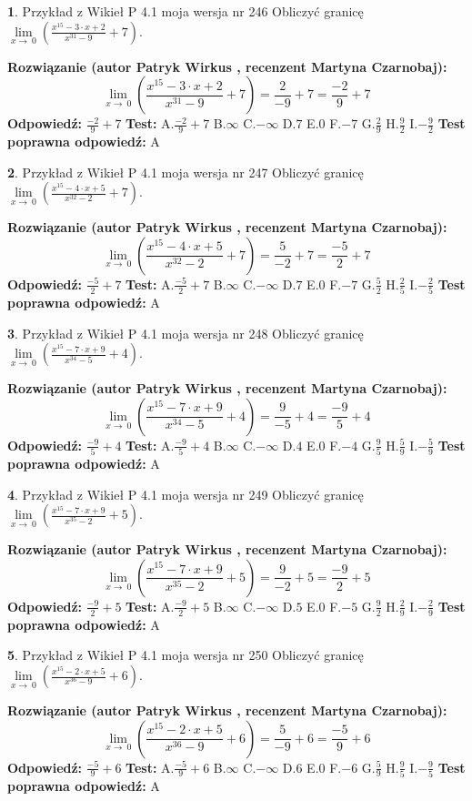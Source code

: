 \documentclass[12pt, a4paper]{article}
\theoremstyle{definition} %
\newtheorem{zad}{}
\newcommand{\zadStart}[1]{\begin{zad}#1\newline}
\newcommand{\zadStop}{\end{zad}}
\newcommand{\rozwStart}[2]{\noindent \textbf{Rozwiązanie (autor #1 , recenzent #2): }\newline}
\newcommand{\rozwStop}{\newline}
\newcommand{\odpStart}{\noindent \textbf{Odpowiedź:}\newline}
\newcommand{\odpStop}{\newline}
\newcommand{\testStart}{\noindent \textbf{Test:}\newline}
\newcommand{\testStop}{\newline}
\newcommand{\kluczStart}{\noindent \textbf{Test poprawna odpowiedź:}\newline}
\newcommand{\kluczStop}{\newline}
\begin{document}
\zadStart{Przykład z Wikieł P 4.1 moja wersja nr 246}
Obliczyć granicę $\lim\limits_{x\to\ 0}(\frac{x^{15}-3 \cdot x +2}{x^{31}-9}+7)$.
\zadStop
\rozwStart{Patryk Wirkus}{Martyna Czarnobaj}
$$\lim\limits_{x\to\ 0}(\frac{x^{15}-3 \cdot x +2}{x^{31}-9}+7)=\frac{2}{-9}+7=\frac{-2}{9}+7$$
\rozwStop
\odpStart
$\frac{-2}{9}+7$
\odpStop
\testStart
A.$\frac{-2}{9}+7$
B.$\infty$
C.$-\infty$
D.$7$
E.$0$
F.$-7$
G.$\frac{2}{9}$
H.$\frac{9}{2}$
I.$-\frac{9}{2}$
\testStop
\kluczStart
A
\kluczStop



\zadStart{Przykład z Wikieł P 4.1 moja wersja nr 247}
Obliczyć granicę $\lim\limits_{x\to\ 0}(\frac{x^{15}-4 \cdot x +5}{x^{32}-2}+7)$.
\zadStop
\rozwStart{Patryk Wirkus}{Martyna Czarnobaj}
$$\lim\limits_{x\to\ 0}(\frac{x^{15}-4 \cdot x +5}{x^{32}-2}+7)=\frac{5}{-2}+7=\frac{-5}{2}+7$$
\rozwStop
\odpStart
$\frac{-5}{2}+7$
\odpStop
\testStart
A.$\frac{-5}{2}+7$
B.$\infty$
C.$-\infty$
D.$7$
E.$0$
F.$-7$
G.$\frac{5}{2}$
H.$\frac{2}{5}$
I.$-\frac{2}{5}$
\testStop
\kluczStart
A
\kluczStop



\zadStart{Przykład z Wikieł P 4.1 moja wersja nr 248}
Obliczyć granicę $\lim\limits_{x\to\ 0}(\frac{x^{15}-7 \cdot x +9}{x^{34}-5}+4)$.
\zadStop
\rozwStart{Patryk Wirkus}{Martyna Czarnobaj}
$$\lim\limits_{x\to\ 0}(\frac{x^{15}-7 \cdot x +9}{x^{34}-5}+4)=\frac{9}{-5}+4=\frac{-9}{5}+4$$
\rozwStop
\odpStart
$\frac{-9}{5}+4$
\odpStop
\testStart
A.$\frac{-9}{5}+4$
B.$\infty$
C.$-\infty$
D.$4$
E.$0$
F.$-4$
G.$\frac{9}{5}$
H.$\frac{5}{9}$
I.$-\frac{5}{9}$
\testStop
\kluczStart
A
\kluczStop



\zadStart{Przykład z Wikieł P 4.1 moja wersja nr 249}
Obliczyć granicę $\lim\limits_{x\to\ 0}(\frac{x^{15}-7 \cdot x +9}{x^{35}-2}+5)$.
\zadStop
\rozwStart{Patryk Wirkus}{Martyna Czarnobaj}
$$\lim\limits_{x\to\ 0}(\frac{x^{15}-7 \cdot x +9}{x^{35}-2}+5)=\frac{9}{-2}+5=\frac{-9}{2}+5$$
\rozwStop
\odpStart
$\frac{-9}{2}+5$
\odpStop
\testStart
A.$\frac{-9}{2}+5$
B.$\infty$
C.$-\infty$
D.$5$
E.$0$
F.$-5$
G.$\frac{9}{2}$
H.$\frac{2}{9}$
I.$-\frac{2}{9}$
\testStop
\kluczStart
A
\kluczStop



\zadStart{Przykład z Wikieł P 4.1 moja wersja nr 250}
Obliczyć granicę $\lim\limits_{x\to\ 0}(\frac{x^{15}-2 \cdot x +5}{x^{36}-9}+6)$.
\zadStop
\rozwStart{Patryk Wirkus}{Martyna Czarnobaj}
$$\lim\limits_{x\to\ 0}(\frac{x^{15}-2 \cdot x +5}{x^{36}-9}+6)=\frac{5}{-9}+6=\frac{-5}{9}+6$$
\rozwStop
\odpStart
$\frac{-5}{9}+6$
\odpStop
\testStart
A.$\frac{-5}{9}+6$
B.$\infty$
C.$-\infty$
D.$6$
E.$0$
F.$-6$
G.$\frac{5}{9}$
H.$\frac{9}{5}$
I.$-\frac{9}{5}$
\testStop
\kluczStart
A
\kluczStop
\end{document}
